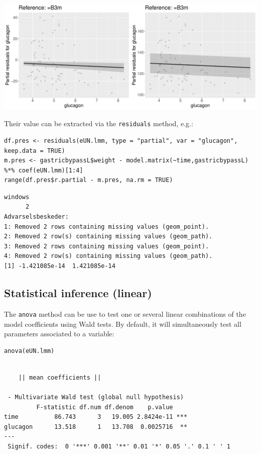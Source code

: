 \documentclass[12pt]{article}
\begin{document}
\begin{center}
\includegraphics[width=\textwidth]{./figures/fit-pres.pdf}
\end{center}

Their value can be extracted via the \texttt{residuals} method, e.g.:
\lstset{language=r,label= ,caption= ,captionpos=b,numbers=none}
\begin{lstlisting}
df.pres <- residuals(eUN.lmm, type = "partial", var = "glucagon", keep.data = TRUE)
m.pres <- gastricbypassL$weight - model.matrix(~time,gastricbypassL) %*% coef(eUN.lmm)[1:4]
range(df.pres$r.partial - m.pres, na.rm = TRUE)
\end{lstlisting}

\begin{verbatim}
windows 
      2 
Advarselsbeskeder:
1: Removed 2 rows containing missing values (geom_point). 
2: Removed 2 row(s) containing missing values (geom_path). 
3: Removed 2 rows containing missing values (geom_point). 
4: Removed 2 row(s) containing missing values (geom_path).
[1] -1.421085e-14  1.421085e-14
\end{verbatim}


\clearpage

\subsection{Statistical inference (linear)}
\label{sec:org46d959b}

The \texttt{anova} method can be use to test one or several linear
combinations of the model coefficients using Wald tests. By default,
it will simultaneously test all parameters associated to a variable:
\lstset{language=r,label= ,caption= ,captionpos=b,numbers=none}
\begin{lstlisting}
anova(eUN.lmm)
\end{lstlisting}

\begin{verbatim}

	|| mean coefficients || 

 - Multivariate Wald test (global null hypothesis)
         F-statistic df.num df.denom    p.value    
time          86.743      3   19.005 2.8424e-11 ***
glucagon      13.518      1   13.708  0.0025716  **
---
 Signif. codes:  0 '***' 0.001 '**' 0.01 '*' 0.05 '.' 0.1 ' ' 1
\end{verbatim}
\end{document}

